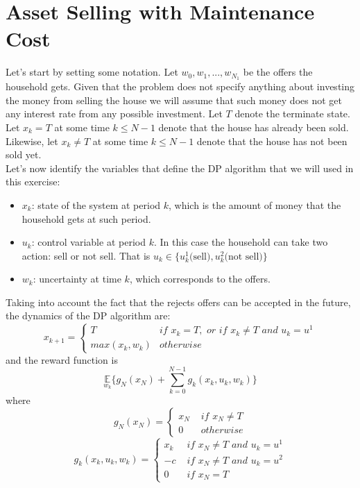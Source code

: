 \documentclass[11pt, oneside]{article}   	%
\begin{document}
\section{Asset Selling with Maintenance Cost}
Let's start by setting some notation. Let $w_{0},w_{1},...,w_{N_1}$ be the offers the household gets. Given that the problem does not specify anything about investing the money from selling the house we will assume that such money does not get any interest rate from any possible investment. Let $T$ denote the terminate state. Let $x_{k} = T$ at some time $k \leq N-1$ denote that the house has already been sold. Likewise, let $x_{k} \neq T$ at some time $k \leq N-1$ denote that the house has not been sold yet.\\

Let's now identify the variables that define the DP algorithm that we will used in this exercise:
\begin{itemize}
	\item $x_{k}$: state of the system at period $k$, which is the amount of money that the household gets at such period.
	\item $u_{k}$: control variable at period $k$. In this case the household can take two action: sell or not sell. That is $u_{k} \in \{u_{k}^{1}\text{(sell)}, u_{k}^{2}\text{(not sell)}\}$
	\item $w_{k}$: uncertainty at time $k$, which corresponds to the offers.
\end{itemize}
Taking into account the fact that the rejects offers can be accepted in the future, the dynamics of the DP algorithm are:
$$x_{k+1} = \begin{cases}
T & if \, \, x_{k}=T, \, \, or \, \, if \, \, x_{k} \neq T \, \, and \, \, u_{k}=u^{1}\\
max(x_{k},w_{k}) & otherwise
\end{cases}$$
and the reward function is
$$\underset{w_{k}}{\mathbb{E}} \bigg\{g_{N}(x_{N}) + \sum_{k=0}^{N-1} g_{k}(x_{k},u_{k},w_{k})\bigg\}$$
where
$$g_{N}(x_{N}) = \begin{cases}
				x_{N} \, \, & if \, \, x_{N} \neq T\\
				0 \, \,  & otherwise
			   \end{cases}
$$
$$g_{k}(x_{k},u_{k},w_{k}) = \begin{cases}
						x_{k} \, \, & if \, \, x_{N} \neq T \, \, and \, \, u_{k} = u^{1}\\
						-c \, \, & if \, \, x_{N} \neq T \, \, and \, \, u_{k} = u^{2}\\
				0 \, \,  &  if \, \, x_{N} = T
			   \end{cases}
$$
\end{document}
